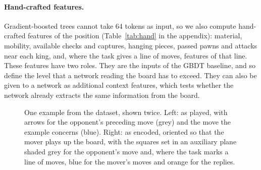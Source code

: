 \begin{table}[htbp]\centering\small
{}
\caption{Scalar context features: the inputs given to every model in addition
to the board.}
\label{tab:reads}
\end{table}

\paragraph{Hand-crafted features.}
Gradient-boosted trees cannot take 64 tokens as input, so we also compute
 hand-crafted features of the position
(Table~\ref{tab:hand} in the appendix): material, mobility, available checks
and captures, hanging pieces, passed pawns and attacks near each king, and,
where the task gives a line of moves, features of that line. These features
have two roles. They are the inputs of the GBDT baseline, and so define the
level that a network reading the board has to exceed. They can also be given
to a network as additional context features, which tests whether the network
already extracts the same information from the board.

\fi

\iflook
\begin{figure}[htbp]\centering
{}
\ifsequence
\caption{One position of one example, shown twice: the position before the
player's most costly move of the game. Left: as played, with arrows for the
opponent's preceding move (grey) and the player's move (blue). Right: as
encoded, oriented so that the mover plays up the board, with the squares set
in an auxiliary plane shaded grey for the opponent's move and blue for the
player's move. Every position of the sequence is encoded in this way.}
\else
\caption{One example from the dataset, shown twice. Left: as played, with
arrows for the opponent's preceding move (grey) and the move the example
concerns (blue). Right: as encoded, oriented so that the mover plays up the
board, with the squares set in an auxiliary plane shaded grey for the
opponent's move and, where the task marks a line of moves, blue for the
mover's moves and orange for the replies.}
\fi
\label{fig:encoding}
\end{figure}
\fi
